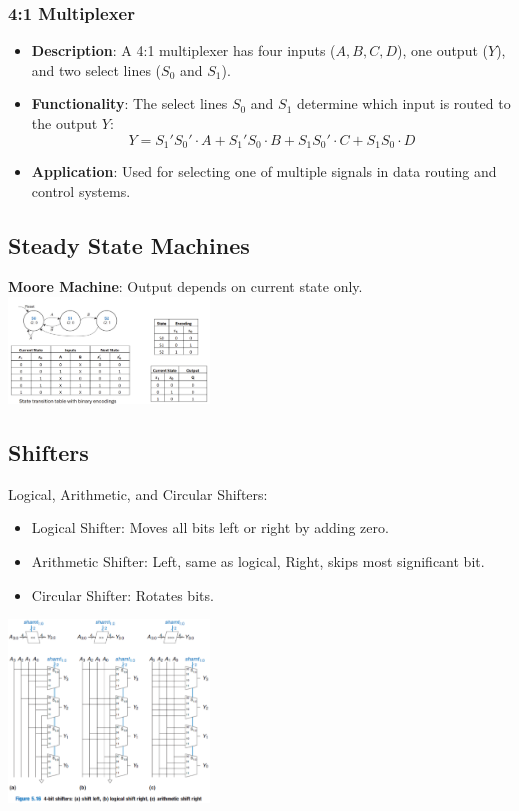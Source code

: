 \documentclass[10pt]{article}
\begin{document}
\begin{multicols*}{2}
\subsubsection{4:1 Multiplexer}
\begin{itemize}
    \item \textbf{Description}: A 4:1 multiplexer has four inputs (\( A, B, C, D \)), one output (\( Y \)), and two select lines (\( S_0 \) and \( S_1 \)).
    \item \textbf{Functionality}: The select lines \( S_0 \) and \( S_1 \) determine which input is routed to the output \( Y \):
    \[
    Y = S_1'S_0' \cdot A + S_1'S_0 \cdot B + S_1S_0' \cdot C + S_1S_0 \cdot D
    \]
    
    \item \textbf{Application}: Used for selecting one of multiple signals in data routing and control systems.
\end{itemize}



\subsection{Steady State Machines}
\textbf{Moore Machine}: Output depends on current state only. \\
\includegraphics[width=0.4\textwidth]{moore machine example.png}

\subsection{Shifters}
Logical, Arithmetic, and Circular Shifters:
\begin{itemize}\itemsep0pt
    \item Logical Shifter: Moves all bits left or right by adding zero.
    \item Arithmetic Shifter: Left, same as logical, Right, skips most significant bit.
    \item Circular Shifter: Rotates bits.
\end{itemize}
\includegraphics[width=0.4\textwidth]{Shifters.png}


\end{multicols*}
\end{document}
